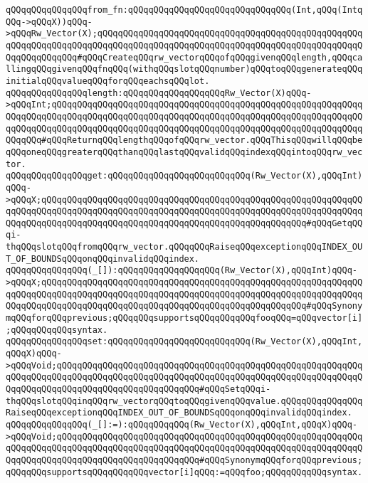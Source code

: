 \verb|qQQqqQQqqQQqqQQqfrom_fn:qQQqqQQqqQQqqQQqqQQqqQQqqQQqqQQq(Int,qQQq(IntqQQq->qQQqX))qQQq->qQQqRw_Vector(X);qQQqqQQqqQQqqQQqqQQqqQQqqQQqqQQqqQQqqQQqqQQqqQQqqQQqqQQqqQQqqQQqqQQqqQQqqQQqqQQqqQQqqQQqqQQqqQQqqQQqqQQqqQQqqQQqqQQqqQQqqQQqqQQqqQQqqQQq#qQQqCreateqQQqrw_vectorqQQqofqQQqgivenqQQqlength,qQQqcallingqQQqgivenqQQqfnqQQq(withqQQqslotqQQqnumber)qQQqtoqQQqgenerateqQQqinitialqQQqvalueqQQqforqQQqeachsqQQqlot.|\newline
\newline
\verb|qQQqqQQqqQQqqQQqlength:qQQqqQQqqQQqqQQqqQQqRw_Vector(X)qQQq->qQQqInt;qQQqqQQqqQQqqQQqqQQqqQQqqQQqqQQqqQQqqQQqqQQqqQQqqQQqqQQqqQQqqQQqqQQqqQQqqQQqqQQqqQQqqQQqqQQqqQQqqQQqqQQqqQQqqQQqqQQqqQQqqQQqqQQqqQQqqQQqqQQqqQQqqQQqqQQqqQQqqQQqqQQqqQQqqQQqqQQqqQQqqQQqqQQqqQQqqQQqqQQqqQQqqQQq#qQQqReturnqQQqlengthqQQqofqQQqrw_vector.qQQqThisqQQqwillqQQqbeqQQqoneqQQqgreaterqQQqthanqQQqlastqQQqvalidqQQqindexqQQqintoqQQqrw_vector.|\newline
\newline
\verb|qQQqqQQqqQQqqQQqget:qQQqqQQqqQQqqQQqqQQqqQQqqQQq(Rw_Vector(X),qQQqInt)qQQq->qQQqX;qQQqqQQqqQQqqQQqqQQqqQQqqQQqqQQqqQQqqQQqqQQqqQQqqQQqqQQqqQQqqQQqqQQqqQQqqQQqqQQqqQQqqQQqqQQqqQQqqQQqqQQqqQQqqQQqqQQqqQQqqQQqqQQqqQQqqQQqqQQqqQQqqQQqqQQqqQQqqQQqqQQqqQQqqQQqqQQqqQQqqQQqqQQqqQQq#qQQqGetqQQqi-thqQQqslotqQQqfromqQQqrw_vector.qQQqqQQqRaiseqQQqexceptionqQQqINDEX_OUT_OF_BOUNDSqQQqonqQQqinvalidqQQqindex.|\newline
\verb|qQQqqQQqqQQqqQQq(_[]):qQQqqQQqqQQqqQQqqQQq(Rw_Vector(X),qQQqInt)qQQq->qQQqX;qQQqqQQqqQQqqQQqqQQqqQQqqQQqqQQqqQQqqQQqqQQqqQQqqQQqqQQqqQQqqQQqqQQqqQQqqQQqqQQqqQQqqQQqqQQqqQQqqQQqqQQqqQQqqQQqqQQqqQQqqQQqqQQqqQQqqQQqqQQqqQQqqQQqqQQqqQQqqQQqqQQqqQQqqQQqqQQqqQQqqQQqqQQqqQQq#qQQqSynonymqQQqforqQQqprevious;qQQqqQQqsupportsqQQqqQQqqQQqfooqQQq=qQQqvector[i];qQQqqQQqqQQqsyntax.|\newline
\newline
\verb|qQQqqQQqqQQqqQQqset:qQQqqQQqqQQqqQQqqQQqqQQqqQQq(Rw_Vector(X),qQQqInt,qQQqX)qQQq->qQQqVoid;qQQqqQQqqQQqqQQqqQQqqQQqqQQqqQQqqQQqqQQqqQQqqQQqqQQqqQQqqQQqqQQqqQQqqQQqqQQqqQQqqQQqqQQqqQQqqQQqqQQqqQQqqQQqqQQqqQQqqQQqqQQqqQQqqQQqqQQqqQQqqQQqqQQqqQQqqQQqqQQqqQQqqQQq#qQQqSetqQQqi-thqQQqslotqQQqinqQQqrw_vectorqQQqtoqQQqgivenqQQqvalue.qQQqqQQqqQQqqQQqRaiseqQQqexceptionqQQqINDEX_OUT_OF_BOUNDSqQQqonqQQqinvalidqQQqindex.|\newline
\verb|qQQqqQQqqQQqqQQq(_[]:=):qQQqqQQqqQQq(Rw_Vector(X),qQQqInt,qQQqX)qQQq->qQQqVoid;qQQqqQQqqQQqqQQqqQQqqQQqqQQqqQQqqQQqqQQqqQQqqQQqqQQqqQQqqQQqqQQqqQQqqQQqqQQqqQQqqQQqqQQqqQQqqQQqqQQqqQQqqQQqqQQqqQQqqQQqqQQqqQQqqQQqqQQqqQQqqQQqqQQqqQQqqQQqqQQqqQQqqQQq#qQQqSynonymqQQqforqQQqprevious;qQQqqQQqsupportsqQQqqQQqqQQqvector[i]qQQq:=qQQqfoo;qQQqqQQqqQQqsyntax.|\newline
